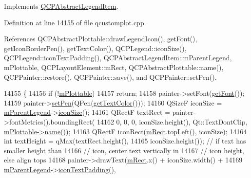 Implements \hyperlink{class_q_c_p_abstract_legend_item_a97dedc084c672359710f16b31d046d1d}{Q\+C\+P\+Abstract\+Legend\+Item}.



Definition at line 14155 of file qcustomplot.\+cpp.



References Q\+C\+P\+Abstract\+Plottable\+::draw\+Legend\+Icon(), get\+Font(), get\+Icon\+Border\+Pen(), get\+Text\+Color(), Q\+C\+P\+Legend\+::icon\+Size(), Q\+C\+P\+Legend\+::icon\+Text\+Padding(), Q\+C\+P\+Abstract\+Legend\+Item\+::m\+Parent\+Legend, m\+Plottable, Q\+C\+P\+Layout\+Element\+::m\+Rect, Q\+C\+P\+Abstract\+Plottable\+::name(), Q\+C\+P\+Painter\+::restore(), Q\+C\+P\+Painter\+::save(), and Q\+C\+P\+Painter\+::set\+Pen().


\begin{DoxyCode}
14155                                                      \{
14156   \textcolor{keywordflow}{if} (!\hyperlink{class_q_c_p_plottable_legend_item_ada647fb4b22971a1a424e15b4f6af0d9}{mPlottable})
14157     \textcolor{keywordflow}{return};
14158   painter->setFont(\hyperlink{class_q_c_p_plottable_legend_item_a8a85c8a25affb4895423d730164d61de}{getFont}());
14159   painter->\hyperlink{class_q_c_p_painter_af9c7a4cd1791403901f8c5b82a150195}{setPen}(QPen(\hyperlink{class_q_c_p_plottable_legend_item_ad762b07439c738660ba93e78c1d03667}{getTextColor}()));
14160   QSizeF iconSize = \hyperlink{class_q_c_p_abstract_legend_item_aafcd9fc6fcb10f4a8d46037011afafe8}{mParentLegend}->\hyperlink{class_q_c_p_legend_a27dfb770b14adc0e8811bef8129780a5}{iconSize}();
14161   QRectF textRect = painter->fontMetrics().boundingRect(
14162       0, 0, 0, iconSize.height(), Qt::TextDontClip, \hyperlink{class_q_c_p_plottable_legend_item_ada647fb4b22971a1a424e15b4f6af0d9}{mPlottable}->\hyperlink{class_q_c_p_abstract_plottable_a1affc1972938e4364a9325e4e4e4dcea}{name}());
14163   QRectF iconRect(\hyperlink{class_q_c_p_layout_element_ad8896f05550389f7b9e92c9e6cdf6e01}{mRect}.topLeft(), iconSize);
14164   \textcolor{keywordtype}{int} textHeight = qMax(textRect.height(),
14165                         iconSize.height()); \textcolor{comment}{// if text has smaller height than}
14166                                             \textcolor{comment}{// icon, center text vertically in}
14167                                             \textcolor{comment}{// icon height, else align tops}
14168   painter->drawText(\hyperlink{class_q_c_p_layout_element_ad8896f05550389f7b9e92c9e6cdf6e01}{mRect}.x() + iconSize.width() +
14169                         \hyperlink{class_q_c_p_abstract_legend_item_aafcd9fc6fcb10f4a8d46037011afafe8}{mParentLegend}->\hyperlink{class_q_c_p_legend_a9d6d07042a284c4ba5f9e3cb5c9281ef}{iconTextPadding}(),

\end{DoxyCode}
